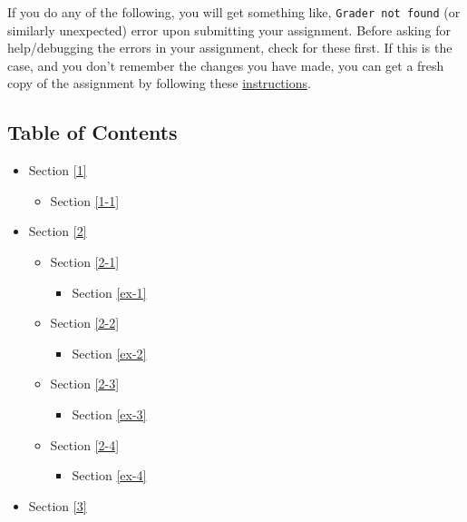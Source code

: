 \documentclass[11pt]{article}
\providecommand{\tightlist}{%
      \setlength{\itemsep}{0pt}\setlength{\parskip}{0pt}}
\begin{document}
If you do any of the following, you will get something like,
\texttt{Grader\ not\ found} (or similarly unexpected) error upon
submitting your assignment. Before asking for help/debugging the errors
in your assignment, check for these first. If this is the case, and you
don't remember the changes you have made, you can get a fresh copy of
the assignment by following these
\href{https://www.coursera.org/learn/deep-neural-network/supplement/QWEnZ/h-ow-to-refresh-your-workspace}{instructions}.

    \hypertarget{table-of-contents}{%
\subsection{Table of Contents}\label{table-of-contents}}

\begin{itemize}
\tightlist
\item
  Section \ref{1}

  \begin{itemize}
  \tightlist
  \item
    Section \ref{1-1}
  \end{itemize}
\item
  Section \ref{2}

  \begin{itemize}
  \tightlist
  \item
    Section \ref{2-1}

    \begin{itemize}
    \tightlist
    \item
      Section \ref{ex-1}
    \end{itemize}
  \item
    Section \ref{2-2}

    \begin{itemize}
    \tightlist
    \item
      Section \ref{ex-2}
    \end{itemize}
  \item
    Section \ref{2-3}

    \begin{itemize}
    \tightlist
    \item
      Section \ref{ex-3}
    \end{itemize}
  \item
    Section \ref{2-4}

    \begin{itemize}
    \tightlist
    \item
      Section \ref{ex-4}
    \end{itemize}
  \end{itemize}
\item
  Section \ref{3}


\end{itemize}
\end{document}
